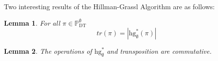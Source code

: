 \documentclass{article}
\newcommand{\dt}[1]{\mathbb{P}_\mathrm{DT}^{#1}}
\newcommand{\hg}[1]{\mathrm{hg}_{#1}}
\newtheorem{lemma}{Lemma}
\begin{document}
\begin{figure}[h]
\begin{multicols}{2}
\begin{center}
{
}
\end{center}

\end{multicols}
\end{figure}

Two interesting results of the Hillman-Grassl Algorithm are as follows:

\begin{lemma} 
	For all $\pi \in \dt{\emptyset}$
	\[
	tr(\pi) = |\hg{\emptyset}^*(\pi)|
	\]
\end{lemma}
\begin{lemma}
	The operations of $\hg{\emptyset}^*$ and transposition are commutative.
\end{lemma}
\end{document}
